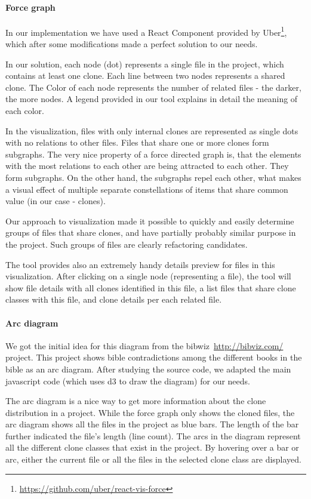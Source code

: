 \documentclass{uva-inf-article}
\begin{document}
\paragraph{Force graph}
In our implementation we have used a React Component provided by Uber\footnote{\url{https://github.com/uber/react-vis-force}}, which after some modifications made a perfect solution to our needs. 

In our solution, each node (dot) represents a single file in the project, which contains at least one clone. Each line between two nodes represents a shared clone. The Color of each node represents the number of related files - the darker, the more nodes. A legend provided in our tool explains in detail the meaning of each color. 

In the visualization, files with only internal clones are represented as single dots with no relations to other files. Files that share one or more clones form subgraphs. The very nice property of a force directed graph is, that the elements with the most relations to each other are being attracted to each other. They form subgraphs. On the other hand, the subgraphs repel each other, what makes a visual effect of multiple separate constellations of items that share common value (in our case - clones). 

Our approach to visualization made it possible to quickly and easily determine groups of files that share clones, and have partially probably similar purpose in the project. Such groups of files are clearly refactoring candidates. 

The tool provides also an extremely handy details preview for files in this visualization. After clicking on a single node (representing a file), the tool will show file details with all clones identified in this file, a list files that share clone classes with this file, and clone details per each related file. 

\paragraph{Arc diagram}
We got the initial idea for this diagram from the bibwiz\
{\url{http://bibviz.com/}} project. This project shows bible contradictions among the different books in the bible as an arc diagram. After studying the source code, we adapted the main javascript code (which uses d3 to draw the diagram) for our needs.

The arc diagram is a nice way to get more information about the clone distribution in a project. While the force graph only shows the cloned files, the arc diagram shows all the files in the project as blue bars. The length of the bar further indicated the file's length (line count). The arcs in the diagram represent all the different clone classes that exist in the project. By hovering over a bar or arc, either the current file or all the files in the selected clone class are displayed.
\end{document}
